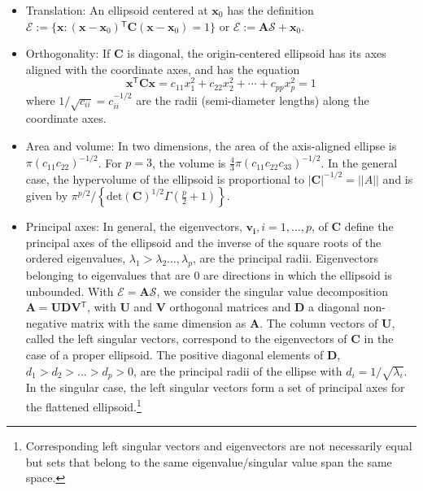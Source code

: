 \documentclass[11pt]{article}%
\renewcommand*{\vec}[1]{\ensuremath{\bm{#1}}}
\newcommand{\trans}{\ensuremath{^\mathsf{T}}}
\newcommand*{\mat}[1]{\ensuremath{\bm{#1}}}
\renewcommand*{\det}[1]{\ensuremath{\mathrm{det} (#1)}}
\begin{document}
\begin{itemize}
 \item Translation: An ellipsoid centered at $\vec{x}_0$ has the definition $\mathcal{E} := \{ \vec{x}: (\vec{x}-\vec{x}_0)\trans \mat{C} (\vec{x}-\vec{x}_0) =1 \}$ or $\mathcal{E} := \mat{A} \mathcal{S} + \vec{x}_0$.

 \item Orthogonality: If $\mat{C}$ is diagonal, the origin-centered ellipsoid has its axes aligned with the coordinate axes, and
has the equation
\begin{equation}\label{eq:ellisoid2}
 \vec{x}\trans \mat{C} \vec{x} = c_{11} x_1^2 + c_{22} x_2^2 + \cdots + c_{pp} x_p^2 =1
\end{equation}
where $1/\sqrt{c_{ii}} = c_{ii}^{-1/2}$ are the radii (semi-diameter lengths) along the coordinate axes.

 \item Area and volume: In two dimensions, the area of the axis-aligned ellipse is $\pi (c_{11} c_{22})^{-1/2}$.
 For $p=3$, the volume is $\frac{4}{3}\pi (c_{11} c_{22} c_{33})^{-1/2}$.
 In the general case, the hypervolume of the ellipsoid is proportional to $|\mat{C}|^{-1/2}=||A||$
 and is given by $\pi^{p/2} / \left\{ \det{\mat{C}}^{1/2} \Gamma(\frac{p}{2}+1) \right\}$.

 \item Principal axes: In general, the eigenvectors, $\vec{v_i}, i=1,\dots,p$,
of $\mat{C}$ define the principal axes of the ellipsoid and
the inverse of the square roots of the ordered
eigenvalues, $\lambda_1 > \lambda_2 \dots, \lambda_p$, are the principal radii. 
Eigenvectors belonging to eigenvalues that are 0 are directions in which the ellipsoid is unbounded. 
With $\mathcal{E} = \mat{A} \mathcal{S}$, we consider the singular value decomposition 
$  \mat{A}= \mat{U} \mat{D} \mat{V} \trans$, 
with $\mat{U}$ and  $\mat{V}$ orthogonal matrices and  $\mat{D}$  a diagonal non-negative matrix 
with the same dimension as $\mat{A}$. 
The column vectors of $\mat{U}$, called the left singular vectors, 
correspond to the eigenvectors of $\mat{C}$ in the case of a proper ellipsoid. 
The positive diagonal elements of $\mat{D}$, $d_1 > d_2 > ... > d_p>0$, 
are the principal radii of the ellipse with $d_i = 1/\sqrt{\lambda_i}$.  
In the singular case, the left singular vectors form a set of principal axes for the flattened ellipsoid.\footnote{Corresponding left singular vectors and eigenvectors are not necessarily equal but sets that belong to the same eigenvalue/singular value span the same space.}


\end{itemize}
\end{document}

